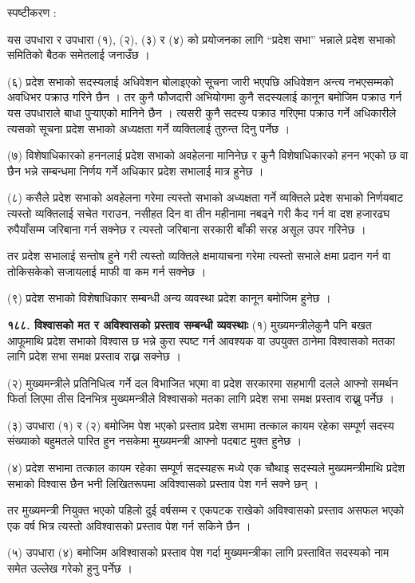 स्पष्टीकरण :

यस उपधारा र उपधारा (१), (२), (३) र (४) को प्रयोजनका लागि “प्रदेश सभा” भन्नाले प्रदेश सभाको समितिको बैठक समेतलाई
जनाउँछ ।

(६) प्रदेश सभाको सदस्यलाई अधिवेशन बोलाइएको सूचना जारी भएपछि अधिवेशन अन्त्य नभएसम्मको अवधिभर पक्राउ गरिने छैन ।
तर कुनै फौजदारी अभियोगमा कुनै सदस्यलाई कानून बमोजिम पक्राउ गर्न यस उपधाराले बाधा पुर्‍याएको मानिने छैन । त्यसरी कुनै सदस्य पक्राउ गरिएमा पक्राउ गर्ने अधिकारीले त्यसको सूचना प्रदेश सभाको अध्यक्षता गर्ने व्यक्तिलाई तुरुन्त दिनु पर्नेछ ।

(७) विशेषाधिकारको हननलाई प्रदेश सभाको अवहेलना मानिनेछ र कुनै विशेषाधिकारको हनन भएको छ वा छैन भन्ने सम्बन्धमा निर्णय गर्ने अधिकार प्रदेश सभालाई मात्र हुनेछ ।

(८) कसैले प्रदेश सभाको अवहेलना गरेमा त्यस्तो सभाको अध्यक्षता गर्ने व्यक्तिले प्रदेश सभाको निर्णयबाट त्यस्तो व्यक्तिलाई सचेत गराउन, नसीहत दिन वा तीन महीनामा नबढ्ने गरी कैद गर्न वा दश हजारढघ रुपैयाँसम्म जरिबाना गर्न सक्नेछ र त्यस्तो जरिबाना सरकारी बाँकी सरह असूल उपर गरिनेछ ।

तर प्रदेश सभालाई सन्तोष हुने गरी त्यस्तो व्यक्तिले क्षमायाचना गरेमा त्यस्तो सभाले क्षमा प्रदान गर्न वा तोकिसकेको सजायलाई माफी वा
कम गर्न सक्नेछ ।

(९) प्रदेश सभाको विशेषाधिकार सम्बन्धी अन्य व्यवस्था प्रदेश कानून बमोजिम हुनेछ ।

\textbf{१८८. विश्वासको मत र अविश्वासको प्रस्ताव सम्बन्धी व्यवस्थाः} (१) मुख्यमन्त्रीलेकुनै पनि बखत आफूमाथि प्रदेश सभाको विश्वास छ भन्ने कुरा स्पष्ट गर्न आवश्यक वा उपयुक्त ठानेमा विश्वासको मतका लागि प्रदेश सभा समक्ष प्रस्ताव राख्न सक्नेछ ।

(२) मुख्यमन्त्रीले प्रतिनिधित्व गर्ने दल विभाजित भएमा वा प्रदेश सरकारमा सहभागी दलले आफ्नो समर्थन फिर्ता लिएमा तीस दिनभित्र
मुख्यमन्त्रीले विश्वासको मतका लागि प्रदेश सभा समक्ष प्रस्ताव राख्नु पर्नेछ ।

(३) उपधारा (१) र (२) बमोजिम पेश भएको प्रस्ताव प्रदेश सभामा तत्काल कायम रहेका सम्पूर्ण सदस्य संख्याको बहुमतले पारित हुन नसकेमा मुख्यमन्त्री आफ्नो पदबाट मुक्त हुनेछ ।

(४) प्रदेश सभामा तत्काल कायम रहेका सम्पूर्ण सदस्यहरू मध्ये एक चौथाइ सदस्यले मुख्यमन्त्रीमाथि प्रदेश सभाको विश्वास छैन भनी
लिखितरूपमा अविश्वासको प्रस्ताव पेश गर्न सक्ने छन् ।

तर मुख्यमन्त्री नियुक्त भएको पहिलो दुई वर्षसम्म र एकपटक राखेको अविश्वासको प्रस्ताव असफल भएको एक वर्ष भित्र त्यस्तो अविश्वासको प्रस्ताव पेश गर्न सकिने छैन ।

(५) उपधारा (४) बमोजिम अविश्वासको प्रस्ताव पेश गर्दा मुख्यमन्त्रीका लागि प्रस्तावित सदस्यको नाम समेत उल्लेख गरेको हुनु
पर्नेछ ।

